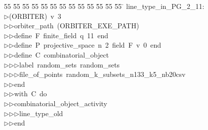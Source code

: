 %
%
\begin{tabbing}
55 \= 55 \= 55 \= 55 \= 55 \= 55 \= 55 \= 55 \= 55 \= 55 \= 55 \= 55 \= 55 \= \kill
line\_type\_in\_PG\_2\_11:\\[0pt]
$\triangleright$\>(ORBITER)\ v\ 3\ \\[0pt]
$\triangleright$\>$\triangleright$\>orbiter\_path\ (ORBITER\_EXE\_PATH)\ \\[0pt]
$\triangleright$\>$\triangleright$\>define\ F\ finite\_field\ q\ 11\ end\ \\[0pt]
$\triangleright$\>$\triangleright$\>define\ P\ projective\_space\ n\ 2\ field\ F\ v\ 0\ end\ \\[0pt]
$\triangleright$\>$\triangleright$\>define\ C\ combinatorial\_object\ \\[0pt]
$\triangleright$\>$\triangleright$\>$\triangleright$\>label\ random\_sets\ random\_sets\ \\[0pt]
$\triangleright$\>$\triangleright$\>$\triangleright$\>file\_of\_points\ random\_k\_subsets\_n133\_k5\_nb20csv\ \\[0pt]
$\triangleright$\>$\triangleright$\>end\ \\[0pt]
$\triangleright$\>$\triangleright$\>with\ C\ do\ \\[0pt]
$\triangleright$\>$\triangleright$\>combinatorial\_object\_activity\ \\[0pt]
$\triangleright$\>$\triangleright$\>$\triangleright$\>line\_type\_old\ \\[0pt]
$\triangleright$\>$\triangleright$\>end\\[0pt]
\end{tabbing}
